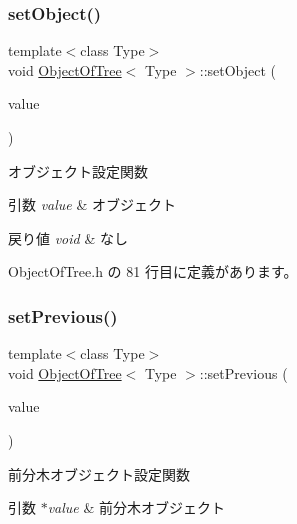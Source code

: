 \subsubsection{\texorpdfstring{set\+Object()}{setObject()}}
{\footnotesize\ttfamily template$<$class Type$>$ \\
void \mbox{\hyperlink{class_object_of_tree}{Object\+Of\+Tree}}$<$ Type $>$\+::set\+Object (\begin{DoxyParamCaption}\item[{Type}]{value }\end{DoxyParamCaption})\hspace{0.3cm}{\ttfamily [inline]}}



オブジェクト設定関数 


\begin{DoxyParams}{引数}
{\em value} & オブジェクト \\
\hline
\end{DoxyParams}

\begin{DoxyRetVals}{戻り値}
{\em void} & なし \\
\hline
\end{DoxyRetVals}


 Object\+Of\+Tree.\+h の 81 行目に定義があります。

\mbox{\label{class_object_of_tree_aa1c690712242605313686bc0a90adf72}} 
\subsubsection{\texorpdfstring{set\+Previous()}{setPrevious()}}
{\footnotesize\ttfamily template$<$class Type$>$ \\
void \mbox{\hyperlink{class_object_of_tree}{Object\+Of\+Tree}}$<$ Type $>$\+::set\+Previous (\begin{DoxyParamCaption}\item[{\mbox{\hyperlink{class_object_of_tree}{Object\+Of\+Tree}}$<$ Type $>$ $\ast$}]{value }\end{DoxyParamCaption})\hspace{0.3cm}{\ttfamily [inline]}}



前分木オブジェクト設定関数 


\begin{DoxyParams}{引数}
{\em $\ast$value} & 前分木オブジェクト \\
\hline
\end{DoxyParams}

